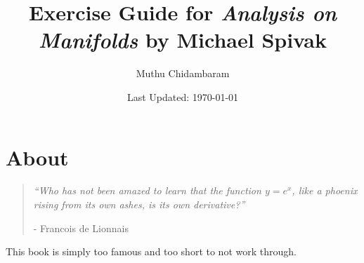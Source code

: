 \documentclass{article}
\begin{document}
\title{Exercise Guide for \textit{Analysis on Manifolds} by Michael Spivak}
\author{Muthu Chidambaram}
\date{Last Updated: \today} 

\maketitle

\tableofcontents
\newpage 

\section*{About}

\begin{quote}
        \textit{``Who has not been amazed to learn that the function $y = e^x$, like a phoenix rising from its own ashes, is its own derivative?''} 
        
        - Francois de Lionnais
\end{quote}

This book is simply too famous and too short to not work through.



\end{document}
